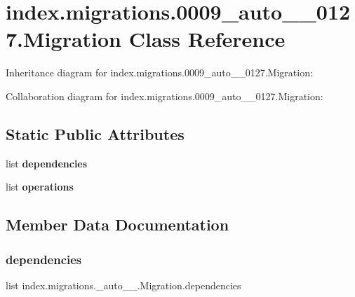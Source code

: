 \hypertarget{classindex_1_1migrations_1_10009__auto__20171016__0127_1_1Migration}{}\section{index.\+migrations.0009\+\_\+auto\+\_\+\_\+0127.Migration Class Reference}
\label{classindex_1_1migrations_1_10009__auto__20171016__0127_1_1Migration}


Inheritance diagram for index.\+migrations.0009\+\_\+auto\+\_\+\_\+0127.Migration\+:


Collaboration diagram for index.\+migrations.0009\+\_\+auto\+\_\+\_\+0127.Migration\+:
\subsection*{Static Public Attributes}
\begin{DoxyCompactItemize}
\item 
list {\bfseries dependencies}
\item 
list {\bfseries operations}
\end{DoxyCompactItemize}


\subsection{Member Data Documentation}
\mbox{\label{classindex_1_1migrations_1_10009__auto__20171016__0127_1_1Migration_ab2908b397341376659f3560bd7deb28c}} 
\subsubsection{\texorpdfstring{dependencies}{dependencies}}
{\footnotesize\ttfamily list index.\+migrations.\+\_\+auto\+\_\+\_.\+Migration.\+dependencies\hspace{0.3cm}{\ttfamily [static]}}

